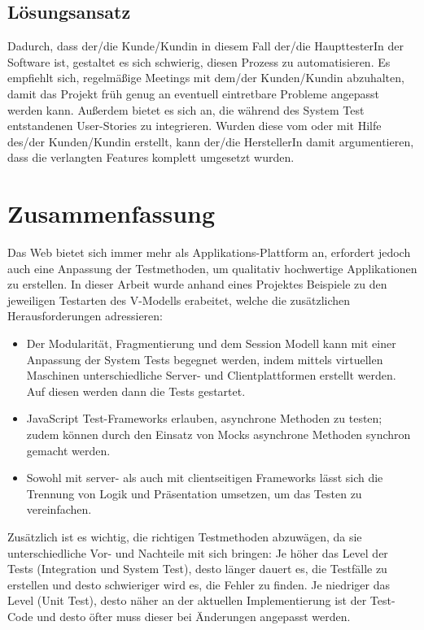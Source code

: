 \documentclass[a4paper,bibtotoc,oneside]{scrbook}
\begin{document}
\section{Lösungsansatz}
Dadurch, dass der/die Kunde/Kundin in diesem Fall der/die HaupttesterIn der Software ist, gestaltet es sich schwierig, diesen Prozess zu automatisieren. Es empfiehlt sich, regelmäßige Meetings mit dem/der Kunden/Kundin abzuhalten, damit das Projekt früh genug an eventuell eintretbare Probleme angepasst werden kann. Außerdem bietet es sich an, die während des System Test entstandenen User-Stories zu integrieren. Wurden diese vom oder mit Hilfe des/der Kunden/Kundin erstellt, kann der/die HerstellerIn damit argumentieren, dass die verlangten Features komplett umgesetzt wurden.


\chapter{Zusammenfassung}
Das Web bietet sich immer mehr als Applikations-Plattform an, erfordert jedoch auch eine Anpassung der Testmethoden, um qualitativ hochwertige Applikationen zu erstellen. In dieser Arbeit wurde anhand eines Projektes Beispiele zu den jeweiligen Testarten des V-Modells erabeitet, welche die zusätzlichen Herausforderungen adressieren:

\begin{itemize}
  \item Der Modularität, Fragmentierung und dem Session Modell kann mit einer Anpassung der System Tests begegnet werden, indem mittels virtuellen Maschinen unterschiedliche Server- und Clientplattformen erstellt werden. Auf diesen werden dann die Tests gestartet.
  \item JavaScript Test-Frameworks erlauben, asynchrone Methoden zu testen; zudem können durch den Einsatz von Mocks asynchrone Methoden synchron gemacht werden.
  \item Sowohl mit server- als auch mit clientseitigen Frameworks lässt sich die Trennung von Logik und Präsentation umsetzen, um das Testen zu vereinfachen.
\end{itemize}

Zusätzlich ist es wichtig, die richtigen Testmethoden abzuwägen, da sie unterschiedliche Vor- und Nachteile mit sich bringen: Je höher das Level der Tests (Integration und System Test), desto länger dauert es, die Testfälle zu erstellen und desto schwieriger wird es, die Fehler zu finden. Je niedriger das Level (Unit Test), desto näher an der aktuellen Implementierung ist der Test-Code und desto öfter muss dieser bei Änderungen angepasst werden.
\end{document}
